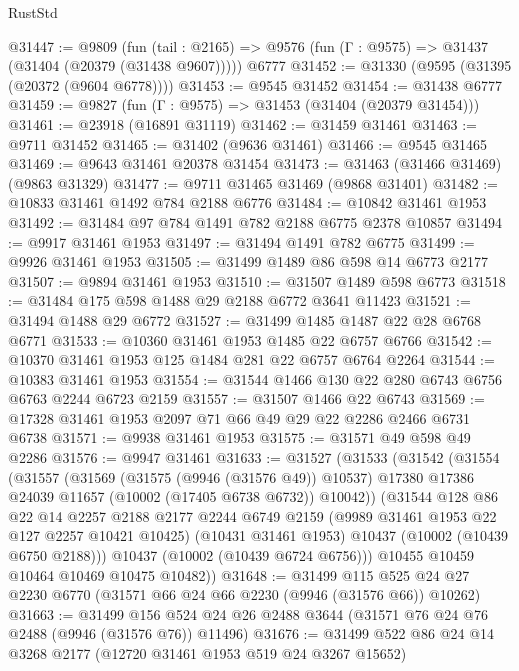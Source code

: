 \begin{lexlean}{RustStd}
\begin{coremodule}
@31447 := @9809
    (fun (tail : @2165) => @9576 (fun (Γ : @9575) => @31437 (@31404 (@20379 (@31438 @9607)))))
    @6777
@31452 := @31330 (@9595 (@31395 (@20372 (@9604 @6778))))
@31453 := @9545 @31452
@31454 := @31438 @6777
@31459 := @9827 (fun (Γ : @9575) => @31453 (@31404 (@20379 @31454)))
@31461 := @23918 (@16891 @31119)
@31462 := @31459 @31461
@31463 := @9711 @31452
@31465 := @31402 (@9636 @31461)
@31466 := @9545 @31465
@31469 := @9643 @31461 @20378 @31454
@31473 := @31463 (@31466 @31469) (@9863 @31329)
@31477 := @9711 @31465 @31469 (@9868 @31401)
@31482 := @10833 @31461 @1492 @784 @2188 @6776
@31484 := @10842 @31461 @1953
@31492 := @31484 @97 @784 @1491 @782 @2188 @6775 @2378 @10857
@31494 := @9917 @31461 @1953
@31497 := @31494 @1491 @782 @6775
@31499 := @9926 @31461 @1953
@31505 := @31499 @1489 @86 @598 @14 @6773 @2177
@31507 := @9894 @31461 @1953
@31510 := @31507 @1489 @598 @6773
@31518 := @31484 @175 @598 @1488 @29 @2188 @6772 @3641 @11423
@31521 := @31494 @1488 @29 @6772
@31527 := @31499 @1485 @1487 @22 @28 @6768 @6771
@31533 := @10360 @31461 @1953 @1485 @22 @6757 @6766
@31542 := @10370 @31461 @1953 @125 @1484 @281 @22 @6757 @6764 @2264
@31544 := @10383 @31461 @1953
@31554 := @31544 @1466 @130 @22 @280 @6743 @6756 @6763 @2244 @6723 @2159
@31557 := @31507 @1466 @22 @6743
@31569 := @17328 @31461 @1953 @2097 @71 @66 @49 @29 @22 @2286 @2466 @6731 @6738
@31571 := @9938 @31461 @1953
@31575 := @31571 @49 @598 @49 @2286
@31576 := @9947 @31461
@31633 := @31527
    (@31533
      (@31542
        (@31554
          (@31557
            (@31569
              (@31575 (@9946 (@31576 @49)) @10537)
              @17380
              @17386
              @24039
              @11657
              (@10002 (@17405 @6738 @6732))
              @10042))
          (@31544
            @128
            @86
            @22
            @14
            @2257
            @2188
            @2177
            @2244
            @6749
            @2159
            (@9989 @31461 @1953 @22 @127 @2257 @10421 @10425)
            (@10431 @31461 @1953)
            @10437
            (@10002 (@10439 @6750 @2188)))
          @10437
          (@10002 (@10439 @6724 @6756)))
        @10455
        @10459
        @10464
        @10469
        @10475
        @10482))
@31648 := @31499
    @115
    @525
    @24
    @27
    @2230
    @6770
    (@31571 @66 @24 @66 @2230 (@9946 (@31576 @66)) @10262)
@31663 := @31499
    @156
    @524
    @24
    @26
    @2488
    @3644
    (@31571 @76 @24 @76 @2488 (@9946 (@31576 @76)) @11496)
@31676 := @31499 @522 @86 @24 @14 @3268 @2177 (@12720 @31461 @1953 @519 @24 @3267 @15652)

\end{coremodule}
\end{lexlean}
